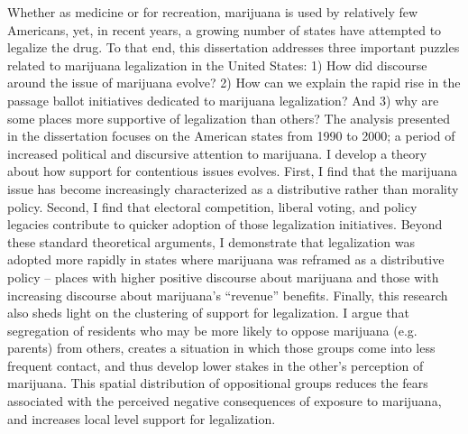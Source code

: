 %

\thesisabstract
{
  Whether as medicine or for recreation, marijuana is used by relatively few Americans, yet, in recent years, a growing number of states have attempted to legalize the drug. To that end, this dissertation addresses three important puzzles related to marijuana legalization in the United States: 1) How did discourse around the issue of marijuana evolve? 2) How can we explain the rapid rise in the passage ballot initiatives dedicated to marijuana legalization? And 3) why are some places more supportive of legalization than others? The analysis presented in the dissertation focuses on the American states from 1990 to 2000; a period of increased political and discursive attention to marijuana. I develop a theory about how support for contentious issues evolves. First, I find that the marijuana issue has become increasingly characterized as a distributive rather than morality policy. Second, I find that electoral competition, liberal voting, and policy legacies contribute to quicker adoption of those legalization initiatives. Beyond these standard theoretical arguments, I demonstrate that legalization was adopted more rapidly in states where marijuana was reframed as a distributive policy -- places with higher positive discourse about marijuana and those with increasing discourse about marijuana's ``revenue'' benefits. Finally, this research also sheds light on the clustering of support for legalization. I argue that segregation of residents who may be more likely to oppose marijuana (e.g. parents) from others, creates a situation in which those groups come into less frequent contact, and thus develop lower stakes in the other's perception of marijuana. This spatial distribution of oppositional groups reduces the fears associated with the perceived negative consequences of exposure to marijuana, and increases local level support for legalization.
  
  
  
  
}
